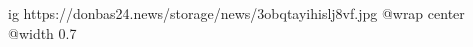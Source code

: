  
 
 
 
 

\ifcmt
  ig https://donbas24.news/storage/news/3obqtayihislj8vf.jpg
  @wrap center
  @width 0.7
\fi
